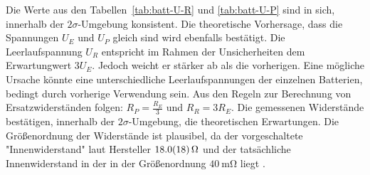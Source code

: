 Die Werte aus den Tabellen~\ref{tab:batt-U-R} und \ref{tab:batt-U-P} sind in sich, innerhalb der  $2\sigma$-Umgebung konsistent. 
Die theoretische Vorhersage, dass die Spannungen $U_E$ und $U_P$ gleich sind wird ebenfalls bestätigt. Die Leerlaufspannung $U_R$ entspricht im Rahmen der Unsicherheiten dem Erwartungwert $3U_E$. Jedoch weicht er stärker ab als die vorherigen. Eine mögliche Ursache könnte eine unterschiedliche Leerlaufspannungen der einzelnen Batterien, bedingt durch vorherige Verwendung sein. Aus den Regeln zur Berechnung von Ersatzwiderständen folgen: $R_P=\frac{R_E}{3}$ und $R_R=3R_E$.
Die gemessenen Widerstände bestätigen, innerhalb der $2\sigma$-Umgebung, die theoretischen Erwartungen. Die Größenordnung der Widerstände ist plausibel, da der vorgeschaltete "Innenwiderstand" laut Hersteller $\SI{18.0+-1.8}{\ohm}$ und der tatsächliche Innenwiderstand in der in der Größenordnung $\SI{40}{\milli \ohm}$ liegt \cite{battanl}. %




